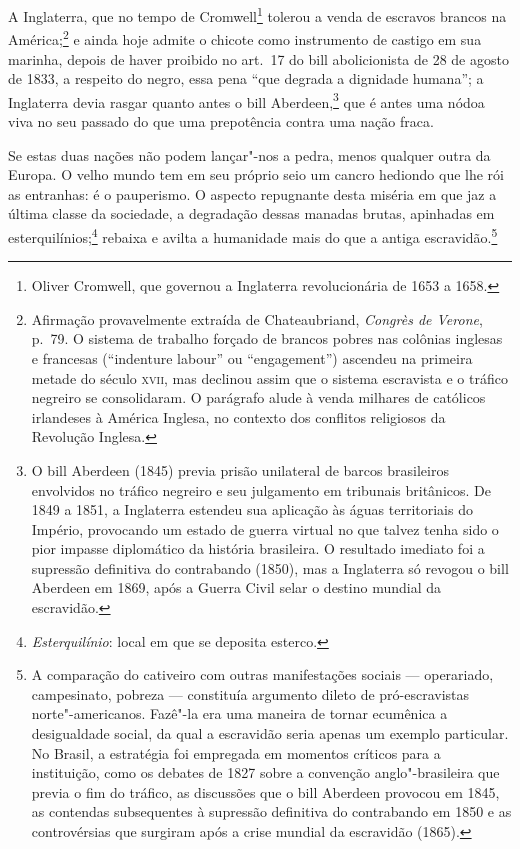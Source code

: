  A Inglaterra, que no tempo de Cromwell\footnote{ Oliver Cromwell, 
que governou a Inglaterra revolucionária de 1653 a 1658.}
 tolerou a venda de escravos brancos na América;\footnote{ Afirmação provavelmente extraída de Chateaubriand, 
\textit{Congrès de Verone}, p.~79. O sistema de trabalho forçado de brancos pobres nas
colônias inglesas e francesas (``indenture labour'' ou ``engagement'')
ascendeu na primeira metade do século \textsc{xvii}, mas declinou assim que o
sistema escravista e o tráfico negreiro se consolidaram. O parágrafo
alude à venda milhares de católicos irlandeses à América Inglesa, no
contexto dos conflitos religiosos da Revolução Inglesa.} 
e ainda hoje admite o chicote como instrumento de castigo em sua
marinha, depois de haver proibido no art.~17 do bill abolicionista de
28 de agosto de 1833, a respeito do negro, essa pena ``que degrada a
dignidade humana''; a Inglaterra devia rasgar quanto antes o bill
Aberdeen,\footnote{ O bill Aberdeen (1845) previa prisão unilateral de barcos 
brasileiros envolvidos no tráfico negreiro e seu julgamento em tribunais britânicos. 
De 1849 a 1851, a Inglaterra estendeu sua aplicação às águas territoriais do Império, 
provocando um estado de guerra \mbox{virtual} no que talvez tenha sido o pior impasse diplomático 
da história brasileira. O resultado imediato foi a supressão definitiva do contrabando (1850), 
mas a Inglaterra só revogou o bill Aberdeen em 1869, após a Guerra Civil selar o destino mundial da escravidão.} 
que é antes uma nódoa viva no seu passado do que uma prepotência contra uma nação fraca.

 Se estas duas nações não podem lançar"-nos a pedra, menos qualquer
outra da Europa. O velho mundo tem em seu próprio seio um cancro
hediondo que lhe rói as entranhas: é o pauperismo. O aspecto repugnante
desta miséria em que jaz a última classe da sociedade, a degradação
dessas manadas brutas, apinhadas em
esterquilínios;\footnote{ \textit{Esterquilínio}: local em que se deposita esterco.} 
rebaixa e avilta a humanidade mais do que a antiga
escravidão.\footnote{ A comparação do cativeiro com outras manifestações sociais --- 
operariado, campesinato, pobreza --- constituía argumento dileto de pró-escravistas norte"-americanos. 
Fazê"-la era uma maneira de tornar ecumênica a desigualdade social, da qual a escravidão seria apenas 
um exemplo particular. No Brasil, a estratégia foi empregada em momentos críticos para a instituição, 
como os debates de 1827 sobre a convenção anglo"-brasileira que previa o fim do tráfico, as discussões 
que o bill Aberdeen provocou em 1845, as contendas subsequentes à supressão definitiva do contrabando 
em 1850 e as controvérsias que surgiram após a crise mundial da escravidão (1865).} 

